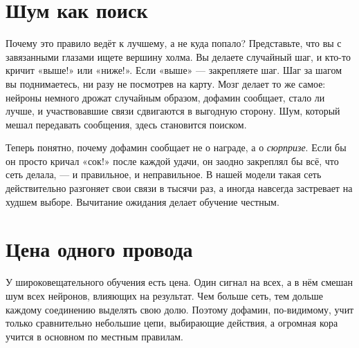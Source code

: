 
\section*{Шум как поиск}

Почему это правило ведёт к лучшему, а не куда попало? Представьте, что вы с завязанными глазами ищете вершину холма. Вы делаете случайный шаг, и кто-то кричит «выше!» или «ниже!». Если «выше» --- закрепляете шаг. Шаг за шагом вы поднимаетесь, ни разу не посмотрев на карту. Мозг делает то же самое: нейроны немного дрожат случайным образом, дофамин сообщает, стало ли лучше, и участвовавшие связи сдвигаются в выгодную сторону. Шум, который мешал передавать сообщения, здесь становится поиском.

Теперь понятно, почему дофамин сообщает не о награде, а о \emph{сюрпризе}. Если бы он просто кричал «сок!» после каждой удачи, он заодно закреплял бы всё, что сеть делала, --- и правильное, и неправильное. В нашей модели такая сеть действительно разгоняет свои связи в тысячи раз, а иногда навсегда застревает на худшем выборе. Вычитание ожидания делает обучение честным.

\section*{Цена одного провода}

У широковещательного обучения есть цена. Один сигнал на всех, а в нём смешан шум всех нейронов, влияющих на результат. Чем больше сеть, тем дольше каждому соединению выделять свою долю. Поэтому дофамин, по-видимому, учит только сравнительно небольшие цепи, выбирающие действия, а огромная кора учится в основном по местным правилам.

